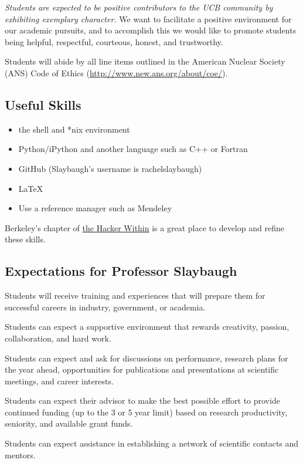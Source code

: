\documentclass[12pt,twoside]{article}
\begin{document}
\textit{Students are expected to be positive contributors to the UCB community by exhibiting exemplary character.} We want to facilitate a positive environment for our academic pursuits, and to accomplish this we would like to promote students being helpful, respectful, courteous, honest, and trustworthy. 

Students will abide by all line items outlined in the American Nuclear Society (ANS) Code of Ethics (\href{http://www.new.ans.org/about/coe/}{http://www.new.ans.org/about/coe/}). 

\begin{center}
\subsection*{Useful Skills}
\end{center}

\begin{itemize}
\item the shell and *nix environment
\item Python/iPython and another language such as C++ or Fortran
\item GitHub (Slaybaugh's username is rachelslaybaugh)
\item \LaTeX
\item Use a reference manager such as Mendeley
\end{itemize}

Berkeley's chapter of \href{http://www.thehackerwithin.org/berkeley/}{the Hacker Within} is a great place to develop and refine these skills.

\begin{center}
\section*{Expectations for Professor Slaybaugh}
\end{center}

Students will receive training and experiences that will prepare them for successful careers in industry, government, or academia.

Students can expect a supportive environment that rewards creativity, passion, collaboration, and hard work.

Students can expect and ask for discussions on performance, research plans for the year ahead, opportunities for publications and presentations at scientific meetings, and career interests.

Students can expect their advisor to make the best possible effort to provide continued funding (up to the 3 or 5 year limit) based on research productivity, seniority, and available grant funds.

Students can expect assistance in establishing a network of scientific contacts and mentors.
\end{document}
